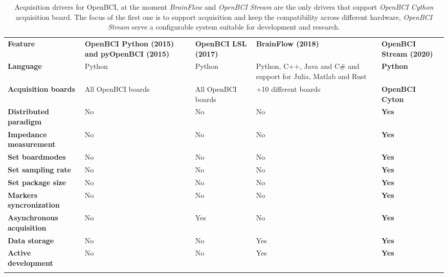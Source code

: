 
\begin{table}
\begin{centering}
\begin{tabular}{>{\raggedright}p{3.6cm}>{\centering}p{3cm}>{\centering}p{1.8cm}>{\centering}p{2cm}>{\centering}p{2cm}}
\toprule 
\addlinespace[1em]
\textbf{Feature} & \textbf{OpenBCI Python (2015) and pyOpenBCI (2015)} & \textbf{OpenBCI LSL (2017)} & \textbf{BrainFlow (2018)} & \textbf{OpenBCI Stream (2020)}\tabularnewline\addlinespace[1em]
\midrule
\addlinespace[1em]
\textbf{Language} & Python & Python & Python, C++, Java and C\# and support for Julia, Matlab and Rust & \textbf{Python}\tabularnewline
\addlinespace[0.5cm]
\addlinespace[1em]
\textbf{Acquisition boards} & All OpenBCI boards & All OpenBCI boards  & +10 different boards & \textbf{OpenBCI Cyton}\tabularnewline
\addlinespace[0.5cm]
\textbf{Distributed paradigm} & No & No & No & \textbf{Yes}\tabularnewline
\addlinespace[0.5cm]
\textbf{Impedance measurement} & No & No & No & \textbf{Yes}\tabularnewline
\addlinespace[0.5cm]
\textbf{Set boardmodes} & No & No & No & \textbf{Yes}\tabularnewline
\addlinespace[0.5cm]
\textbf{Set sampling rate} & No & No & No & \textbf{Yes}\tabularnewline
\addlinespace[0.5cm]
\textbf{Set package size} & No & No & No & \textbf{Yes}\tabularnewline
\addlinespace[0.5cm]
\textbf{Markers syncronization} & No & No & No & \textbf{Yes}\tabularnewline
\addlinespace[0.5cm]
\textbf{Asynchronous acquisition} & No & Yes & No & \textbf{Yes}\tabularnewline
\addlinespace[0.5cm]
\textbf{Data storage} & No & No & Yes & \textbf{Yes}\tabularnewline
\addlinespace[0.5cm]
\textbf{Active development} & No & No & Yes & \textbf{Yes}\tabularnewline\addlinespace[1em]
\bottomrule
\addlinespace[0.5cm]
\end{tabular}
\par\end{centering}
\caption{Acquisition drivers for OpenBCI, at the moment \textit{BrainFlow} and \textit{OpenBCI Stream} are the only drivers that support \textit{OpenBCI Cython} acquisition board. The focus of the first one is to support acquisition and keep the compatibility across different hardware, \textit{OpenBCI Stream} serve a configurable system suitable for development and research.
\label{table:acquisition_drivers}}
\end{table}
